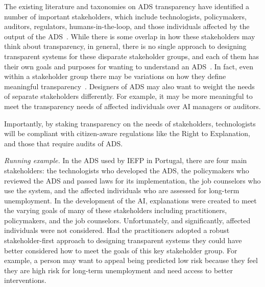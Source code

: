 The existing literature and taxonomies on ADS transparency have identified a number of important stakeholders, which include technologists, policymakers, auditors, regulators, humans-in-the-loop, and those individuals affected by the output of the ADS~\cite{DBLP:journals/corr/abs-2010-14374, meske, meyers2007street}.  While there is some overlap in how these stakeholders may think about transparency, in general, there is no single approach to designing transparent systems for these disparate stakeholder groups, and each of them has their own goals and purposes for wanting to understand an ADS~\cite{DBLP:journals/corr/abs-2001-09734}.  In fact, even within a stakeholder group there may be variations on how they define meaningful transparency~\cite{DBLP:conf/chi/HohmanHCDD19}. Designers of ADS may also want to weight the needs of separate stakeholders differently. For example, it may be more meaningful to meet the transparency needs of affected individuals over AI managers or auditors.

Importantly, by staking transparency on the needs of stakeholders, technologists will be compliant with citizen-aware regulations like the Right to Explanation, and those that require audits of ADS.

\emph{Running example.} In the ADS used by IEFP in Portugal, there are four main stakeholders: the technologists who developed the ADS, the policymakers who reviewed the ADS and passed laws for its implementation, the job counselors who use the system, and the affected individuals who are assessed for long-term unemployment.  In the development of the AI, explanations were created to meet the varying goals of many of these stakeholders including practitioners, policymakers, and the job counselors.  Unfortunately, and significantly, affected individuals were not considered.  Had the practitioners adopted a robust stakeholder-first approach to designing transparent systems they could have better considered how to meet the goals of this key stakeholder group. For example, a person may want to appeal being predicted low risk because they feel they are high risk for long-term unemployment and need access to better interventions.


